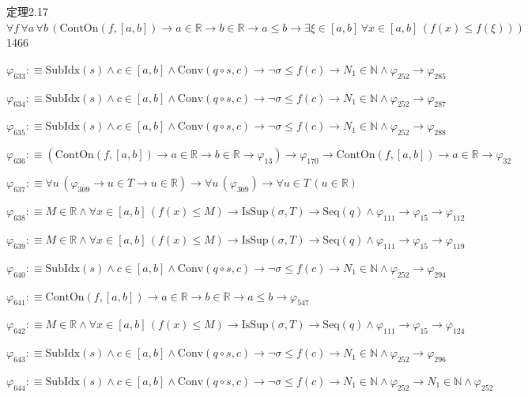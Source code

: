 \begin{fullproof}{定理2.17}{$\forall f\,\forall a\,\forall b\,(\mathrm{ContOn}(f,[a,b]) \to a \in \mathbb{R} \to b \in \mathbb{R} \to a \leq b \to \exists \xi \in [a,b]\,\forall x \in [a,b]\,(f(x) \leq f(\xi)))$}{1466}
\begin{abbrevlist}
\item $\varphi_{633} :\equiv \mathrm{SubIdx}(s) \land c \in [a,b] \land \mathrm{Conv}(q \circ s,c) \to \neg \sigma \leq f(c) \to N_{1} \in \mathbb{N} \land \varphi_{252} \to \varphi_{285}$
\item $\varphi_{634} :\equiv \mathrm{SubIdx}(s) \land c \in [a,b] \land \mathrm{Conv}(q \circ s,c) \to \neg \sigma \leq f(c) \to N_{1} \in \mathbb{N} \land \varphi_{252} \to \varphi_{287}$
\item $\varphi_{635} :\equiv \mathrm{SubIdx}(s) \land c \in [a,b] \land \mathrm{Conv}(q \circ s,c) \to \neg \sigma \leq f(c) \to N_{1} \in \mathbb{N} \land \varphi_{252} \to \varphi_{288}$
\item $\varphi_{636} :\equiv (\mathrm{ContOn}(f,[a,b]) \to a \in \mathbb{R} \to b \in \mathbb{R} \to \varphi_{13}) \to \varphi_{170} \to \mathrm{ContOn}(f,[a,b]) \to a \in \mathbb{R} \to \varphi_{32}$
\item $\varphi_{637} :\equiv \forall u\,(\varphi_{309} \to u \in T \to u \in \mathbb{R}) \to \forall u\,(\varphi_{309}) \to \forall u \in T\,(u \in \mathbb{R})$
\item $\varphi_{638} :\equiv M \in \mathbb{R} \land \forall x \in [a,b]\,(f(x) \leq M) \to \mathrm{IsSup}(\sigma,T) \to \mathrm{Seq}(q) \land \varphi_{111} \to \varphi_{15} \to \varphi_{112}$
\item $\varphi_{639} :\equiv M \in \mathbb{R} \land \forall x \in [a,b]\,(f(x) \leq M) \to \mathrm{IsSup}(\sigma,T) \to \mathrm{Seq}(q) \land \varphi_{111} \to \varphi_{15} \to \varphi_{119}$
\item $\varphi_{640} :\equiv \mathrm{SubIdx}(s) \land c \in [a,b] \land \mathrm{Conv}(q \circ s,c) \to \neg \sigma \leq f(c) \to N_{1} \in \mathbb{N} \land \varphi_{252} \to \varphi_{294}$
\item $\varphi_{641} :\equiv \mathrm{ContOn}(f,[a,b]) \to a \in \mathbb{R} \to b \in \mathbb{R} \to a \leq b \to \varphi_{547}$
\item $\varphi_{642} :\equiv M \in \mathbb{R} \land \forall x \in [a,b]\,(f(x) \leq M) \to \mathrm{IsSup}(\sigma,T) \to \mathrm{Seq}(q) \land \varphi_{111} \to \varphi_{15} \to \varphi_{124}$
\item $\varphi_{643} :\equiv \mathrm{SubIdx}(s) \land c \in [a,b] \land \mathrm{Conv}(q \circ s,c) \to \neg \sigma \leq f(c) \to N_{1} \in \mathbb{N} \land \varphi_{252} \to \varphi_{296}$
\item $\varphi_{644} :\equiv \mathrm{SubIdx}(s) \land c \in [a,b] \land \mathrm{Conv}(q \circ s,c) \to \neg \sigma \leq f(c) \to N_{1} \in \mathbb{N} \land \varphi_{252} \to N_{1} \in \mathbb{N} \land \varphi_{252}$

\end{abbrevlist}
\end{fullproof}
